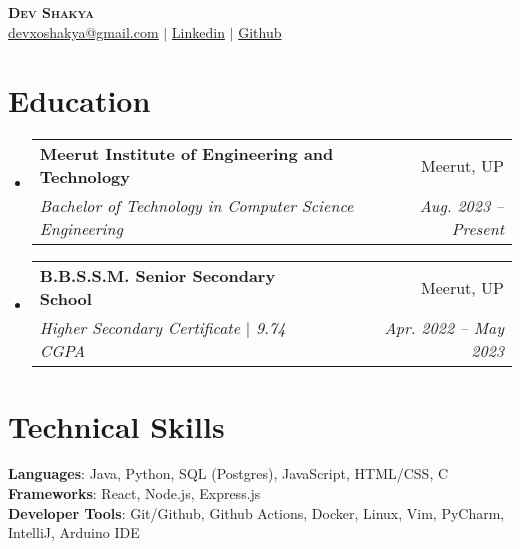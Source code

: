 \documentclass[letterpaper,11pt]{article}
\makeatletter
\newcommand{\resumeSubheading}[4]{
  \vspace{-2pt}\item
    \begin{tabular*}{0.97\textwidth}[t]{l@{\extracolsep{\fill}}r}
      \textbf{#1} & #2 \\
      \textit{\small#3} & \textit{\small #4} \\
    \end{tabular*}\vspace{-7pt}
}
\newcommand{\resumeSubHeadingListStart}{\begin{itemize}[leftmargin=0.15in, label={}]}
\newcommand{\resumeSubHeadingListEnd}{\end{itemize}}
\makeatother
\begin{document}

\begin{center}
    \textbf{\Huge \scshape Dev Shakya} \\ \vspace{1pt}
    \small \href{mailto:devxoshakya@gmail.com}{\underline{devxoshakya@gmail.com}} $|$ 
    \href{https://linkedin.com/in/devxoshakya}{ {Linkedin}} $|$
    \href{https://github.com/devxoshakya}{ {Github}}
\end{center}


\section{Education}
  \resumeSubHeadingListStart
    \resumeSubheading
      {Meerut Institute of Engineering and Technology}{Meerut, UP}
      {Bachelor of Technology in Computer Science Engineering}{Aug. 2023 -- Present}
    \resumeSubheading
      {B.B.S.S.M. Senior Secondary School}{Meerut, UP}
      {Higher Secondary Certificate $|$ 9.74 CGPA}{Apr. 2022 -- May 2023}
  \resumeSubHeadingListEnd

  
\section{Technical Skills}
 \begin{itemize}[leftmargin=0.15in, label={}]
    \small{\item{
     \textbf{Languages}{: Java, Python, SQL (Postgres), JavaScript, HTML/CSS, C} \\
     \textbf{Frameworks}{: React, Node.js, Express.js} \\
     \textbf{Developer Tools}{: Git/Github, Github Actions, Docker, Linux, Vim, PyCharm, IntelliJ, Arduino IDE} \\
    }}
 \end{itemize}


\end{document}
